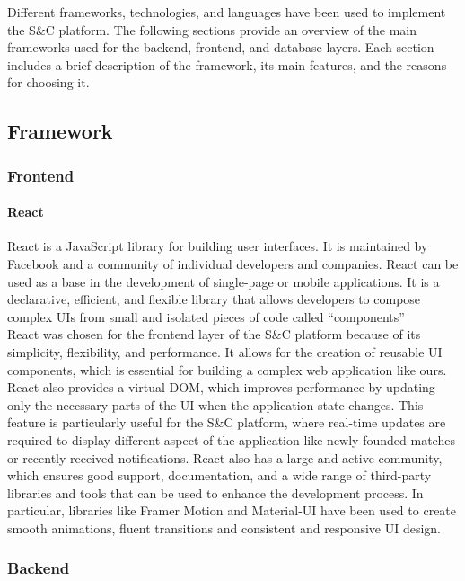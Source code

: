 Different frameworks, technologies, and languages have been used to implement the S\&C platform. The following sections provide an overview of the main frameworks used for the backend, frontend, and database layers. Each section includes a brief description of the framework, its main features, and the reasons for choosing it.
\subsection{Framework}
\subsubsection{Frontend}
\paragraph{React} 
React is a JavaScript library for building user interfaces. It is maintained by Facebook and a community of individual developers and companies. React can be used as a base in the development of single-page or mobile applications. It is a declarative, efficient, and flexible library that allows developers to compose complex UIs from small and isolated pieces of code called “components”\\
React was chosen for the frontend layer of the S\&C platform because of its simplicity, flexibility, and performance. It allows for the creation of reusable UI components, which is essential for building a complex web application like ours. React also provides a virtual DOM, which improves performance by updating only the necessary parts of the UI when the application state changes. This feature is particularly useful for the S\&C platform, where real-time updates are required to display different aspect of the application like newly founded matches or recently received notifications. React also has a large and active community, which ensures good support, documentation, and a wide range of third-party libraries and tools that can be used to enhance the development process. In particular, libraries like Framer Motion and Material-UI have been used to create smooth animations, fluent transitions and consistent and responsive UI design.
\subsubsection{Backend}
